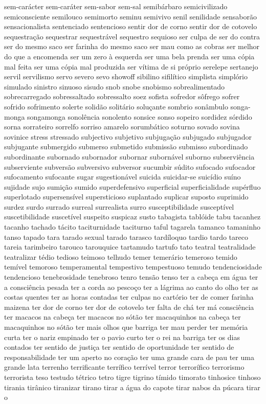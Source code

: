 \documentclass[ruledheader]{abnt_UFF}
\begin{document}
sem-car\'{a}cter sem-car\'{a}ter sem-sabor sem-sal semib\'{a}rbaro semicivilizado semiconsciente semilouco semimorto seminu semivivo senil senilidade sensabor\~ao sensacionalista sentenciado sentencioso sentir dor de corno sentir dor de cotovelo sequestra\c{c}\~ao sequestrar sequestr\'{a}vel sequestro sequioso ser culpa de ser do contra ser do mesmo saco ser farinha do mesmo saco ser mau como as cobras ser melhor do que a encomenda ser um zero \`{a} esquerda ser uma bela prenda ser uma c\'{o}pia mal feita ser uma c\'{o}pia mal produzida ser v\'{i}tima de si pr\'{o}prio serelepe sertanejo servil servilismo servo severo sevo showoff sibilino sifil\'{i}tico simplista simpl\'{o}rio simulado sinistro sinuoso sisudo snob snobe snobismo sobrealimentado sobrecarregado sobressaltado sobressalto soez sofista sofredor s\^{o}frego sofrer sofrido sofrimento solerte solid\~ao solit\'{a}rio solu\c{c}ante sombrio son\^{a}mbulo songa-monga songamonga sonol\^{e}ncia sonolento sonsice sonso sopeiro sordidez s\'{o}rdido sorna sorrateiro sorrelfo sorriso amarelo sorumb\'{a}tico soturno sovado sovina sovinice stress stressado subjectivo subjetivo subjuga\c{c}\~ao subjugado subjugador subjugante submergido submerso submetido submiss\~ao submisso subordinado subordinante subornado subornador subornar suborn\'{a}vel suborno subservi\^{e}ncia subserviente subvers\~ao subversivo subversor sucumbir s\'{u}dito sufocado sufocador sufocamento sufocante sugar sugestion\'{a}vel suicida suicidar-se suic\'{i}dio su\'{i}no sujidade sujo sumi\c{c}\~ao sumido superdefensivo superficial superficialidade sup\'{e}rfluo superlotado supersens\'{i}vel supersticioso suplantado suplicar suposto suprimido surdez surdo surrado surreal surrealista surro susceptibilidade suscept\'{i}vel suscetibilidade suscet\'{i}vel suspeito suspicaz susto tabagista tabl\'{o}ide tabu tacanhez tacanho tachado t\'{a}cito taciturnidade taciturno taful tagarela tamanco tamaninho tanso tapado tara tarado sexual tarado tarasco tard\'{i}loquo tardio tardo tareco tareia tarimbeiro tarouco tarouquice tartamudo tartufo tato teatral teatralidade teatralizar t\'{e}dio tedioso teimoso telhudo temer temer\'{a}rio temeroso temido tem\'{i}vel temoroso temperamental tempestivo tempestuoso temudo tendenciosidade tendencioso tenebrosidade tenebroso tenro tens\~ao tenso ter a cabe\c{c}a em \'{a}gua ter a consci\^{e}ncia pesada ter a corda ao pesco\c{c}o ter a l\'{a}grima ao canto do olho ter as costas quentes ter as horas contadas ter culpas no cart\'{o}rio ter de comer farinha maizena ter dor de corno ter dor de cotovelo ter falta de ch\'{a} ter m\'{a} consci\^{e}ncia ter macacos na cabe\c{c}a ter macacos no s\'{o}t\~ao ter macaquinhos na cabe\c{c}a ter macaquinhos no s\'{o}t\~ao ter mais olhos que barriga ter mau perder ter mem\'{o}ria curta ter o nariz empinado ter o pavio curto ter o rei na barriga ter os dias contados ter sentido de justi\c{c}a ter sentido de oportunidade ter sentido de responsabilidade ter um aperto no cora\c{c}\~ao ter uma grande cara de pau ter uma grande lata terrenho terrificante terr\'{i}fico terr\'{i}vel terror terror\'{i}fico terrorismo terrorista teso testudo t\'{e}trico tetro tigre tigrino t\'{i}mido timorato tinhosice tinhoso tirania tir\^{a}nico tiranizar tirano tirar a \'{a}gua do capote tirar nabos da p\'{u}cara tirar o 
\end{document}
